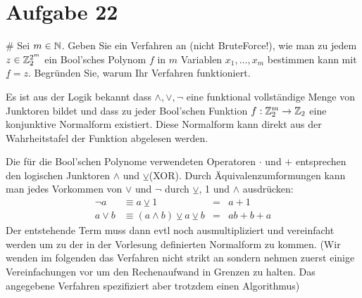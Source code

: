 
\setcounter{MaxMatrixCols}{20}

\section*{Aufgabe 22}
\begin{myList}
#
Sei $m \in \mathbb{N}$. Geben Sie ein Verfahren an (nicht BruteForce!), wie man zu jedem $z \in \mathbb{Z}^{2^m}_2$ ein Bool'sches Polynom $f$ in $m$ Variablen $x_1,\ldots,x_m$ bestimmen kann mit $\underline{f} = z$. Begründen Sie, warum Ihr Verfahren funktioniert.\medskip

Es ist aus der Logik bekannt dass $\wedge,\vee,\neg$ eine funktional vollständige Menge von Junktoren bildet und dass zu jeder Bool'schen Funktion $f:\mathbb{Z}_2^m \rightarrow \mathbb{Z}_2$ eine konjunktive Normalform existiert.
Diese Normalform kann direkt aus der Wahrheitstafel der Funktion abgelesen werden.\medskip

Die für die Bool'schen Polynome verwendeten Operatoren $\cdot$ und $+$ entsprechen den logischen Junktoren $\wedge$ und $\veebar$(XOR).
Durch Äquivalenzumformungen kann man jedes Vorkommen von $\vee$ und $\neg$ durch $\veebar$, 1 und $\wedge$ ausdrücken:
\begin{align*}
	\neg a &\equiv a \veebar 1 &=& a + 1 \\
	a \vee b &\equiv (a\wedge b) \veebar a \veebar b &=& ab + b + a
\end{align*}
Der entstehende Term muss dann evtl noch ausmultipliziert und vereinfacht werden um zu der in der Vorlesung definierten Normalform zu kommen.
(Wir wenden im folgenden das Verfahren nicht strikt an sondern nehmen zuerst einige Vereinfachungen vor um den Rechenaufwand in Grenzen zu halten. Das angegebene Verfahren spezifiziert aber trotzdem einen Algorithmus)


\end{myList}
